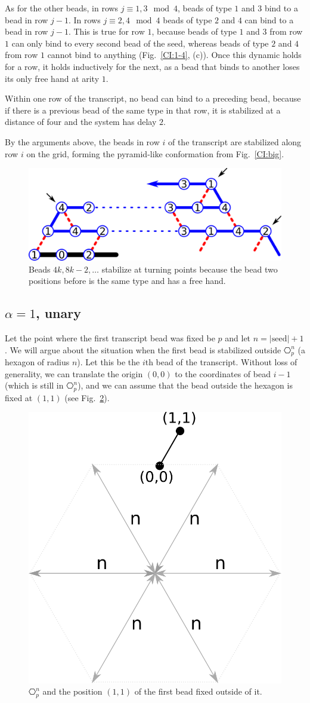 As for the other beads, in rows $j\equiv 1,3\mod 4$, beads of type $1$ and $3$ bind to a bead in row $j-1$. In rows $j\equiv 2,4\mod 4$ beads of type $2$ and $4$ can bind to a bead in row $j-1$.  This is true for row $1$, because beads of type $1$ and $3$ from row $1$ can only bind to every second bead of the seed, whereas beads of type $2$ and $4$ from row $1$ cannot bind to anything (Fig.~\ref{CI:1-4}, (c)). Once this dynamic holds for a row, it holds inductively for the next, as a bead that binds to another loses its only free hand at arity $1$.

Within one row of the transcript, no bead can bind to a preceding bead, because if there is a previous bead of the same type in that row, it is stabilized at a distance of four and the system has delay $2$.

By the arguments above, the beads in row $i$ of the transcript are stabilized along row $i$ on the grid, forming the pyramid-like conformation from Fig.~\ref{CI:big}.


\begin{figure}
	\centering
	\includegraphics[width=0.7\linewidth]{./Fig/CI_turnn}
	\caption{Beads $4k, 8k-2, \dots$ stabilize at turning points because the bead two positions before is the same type and has a free hand.}
	\label{CI:turn}
\end{figure}




\subsection{$\alpha = 1$, unary}

Let the point where the first transcript bead was fixed be $p$ and let $n=|\mathrm{seed}|+1$. We will argue about the situation when the first bead is stabilized outside $\hexagon_p^n$ (a hexagon of radius $n$). Let this be the $i$th bead of the transcript. Without loss of generality, we can translate the origin $(0,0)$ to the coordinates of bead $i-1$ (which is still in $\hexagon_p^n$), and we can assume that the bead outside the hexagon is fixed at $(1,1)$ (see Fig.~\ref{fig:hexagonOut}).
\begin{figure}
	\centering
	\includegraphics[width=0.3\linewidth]{./Fig/hexagonOut}
	\caption{$\hexagon_p^n$ and the position $(1,1)$ of the first bead fixed outside of it.}
	\label{fig:hexagonOut}
\end{figure}

